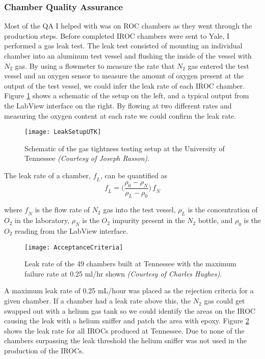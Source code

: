 \subsubsection{Chamber Quality Assurance}

Most of the QA I helped with was on ROC chambers as they went through the production steps.  Before completed IROC chambers were sent to Yale, I performed a gas leak test.  The leak test consisted of mounting an individual chamber into an aluminum test vessel and flushing the inside of the vessel with $N_{2}$ gas.  By using a flowmeter to measure the rate that $N_{2}$ gas entered the test vessel and an oxygen sensor to measure the amount of oxygen present at the output of the test vessel, we could infer the leak rate of each IROC chamber.  Figure \ref{fig:LeakTest} shows a schematic of the setup on the left, and a typical output from the LabView interface on the right.  By flowing at two different rates and measuring the oxygen content at each rate we could confirm the leak rate.

\begin{figure}[t!]
\texttt{[image: LeakSetupUTK]}
\centering
\caption{Schematic of the gas tightness testing setup at the University of Tennessee \textit{(Courtesy of Joseph Rasson)}. }
\label{fig:LeakTest}
\end{figure}


The leak rate of a chamber, $\mathit{f_{L}}$,  can be quantified as
\begin{equation}
\mathit{f_{L}} =\Bigg(  \frac{\rho_{0} -\rho_{N}}{\rho_{L} -\rho_{0}} \Bigg) \,  \mathit{f_{N}}
\label{eq:leakrate}
\end{equation}

\noindent
where $\mathit{f_{N}}$ is the flow rate of $N_{2}$ gas into the test vessel, $\rho_{L}$ is the concentration of $O_{2}$ in the laboratory, $\rho_{N}$ is the $O_{2}$ impurity present in the $N_{2}$ bottle, and $\rho_{0}$ is the $O_{2}$ reading from the LabView interface.  

\begin{figure}[t!]
\texttt{[image: AcceptanceCriteria]}
\centering
\caption{Leak rate of the 49 chambers built at Tennessee with the maximum failure rate at 0.25 ml/hr shown \textit{(Courtesy of Charles Hughes)}. }
\label{fig:IROCLeaK}
\end{figure}


A maximum leak rate of 0.25 mL/hour was placed as the rejection criteria for a given chamber.  If a chamber had a leak rate above this, the $N_{2}$ gas could get swapped out with a helium gas tank so we could identify the areas on the IROC causing the leak with a helium sniffer and patch the area with epoxy.  Figure \ref{fig:IROCLeaK} shows the leak rate for all IROCs produced at Tennessee.  Due to none of the chambers surpassing the leak threshold the helium sniffer was not used in the production of the IROCs. 

